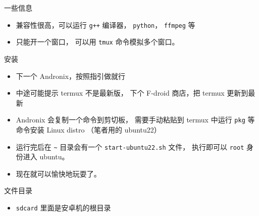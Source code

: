 
一些信息
\begin{itemize}
\item 兼容性很高，可以运行 \verb`g++` 编译器， \verb`python`， \verb`ffmpeg` 等
\item 只能开一个窗口， 可以用 \verb`tmux` 命令模拟多个窗口。
\end{itemize}


安装
\begin{itemize}
\item 下一个 Andronix，按照指引做就行
\item 中途可能提示 termux 不是最新版， 下个 F-droid 商店，把 termux 更新到最新
\item Andronix 会复制一个命令到剪切板， 需要手动粘贴到 termux 中运行 \verb`pkg` 等命令安装 Linux distro （笔者用的 ubuntu22）
\item 运行完后在 \verb`~` 目录会有一个 \verb`start-ubuntu22.sh` 文件， 执行即可以 \verb`root` 身份进入 ubuntu。
\item 现在就可以愉快地玩耍了。
\end{itemize}


文件目录
\begin{itemize}
\item \verb`sdcard` 里面是安卓机的根目录
\end{itemize}

